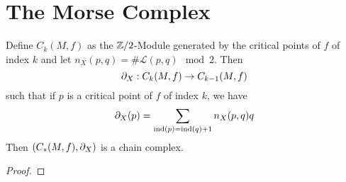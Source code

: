 \section{The Morse Complex}

\begin{prop}
    Define $C_k(M, f)$ as the ${ \mathbb Z }/2$-Module generated by the critical points of $f$ of
    index $k$ and let $n_X(p, q) = \# \mathcal{L}(p, q) \mod 2$. Then
    \[ { \partial }_X : C_k(M, f) \to C_{k-1}(M, f) \]
    such that if $p$ is a critical point of $f$ of index $k$, we have
    \[ { \partial }_X(p) = \sum_{{ \operatorname{ind} }(p) = { \operatorname{ind} }(q) + 1} n_X(p, q)q \]
    Then $(C_*(M, f), { \partial }_X)$ is a chain complex.
\end{prop}

\begin{proof}
\end{proof}